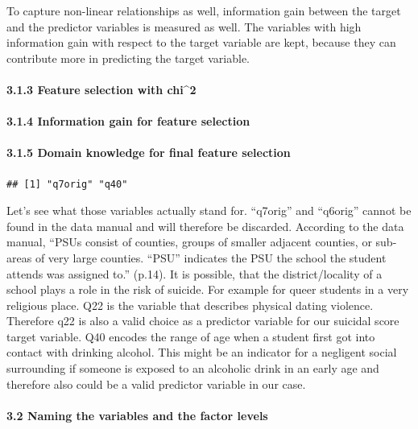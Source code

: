 \documentclass[
]{article}
\begin{document}
To capture non-linear relationships as well, information gain between
the target and the predictor variables is measured as well. The
variables with high information gain with respect to the target variable
are kept, because they can contribute more in predicting the target
variable.

\hypertarget{feature-selection-with-chi2}{%
\paragraph{3.1.3 Feature selection with
chi\^{}2}\label{feature-selection-with-chi2}}

\hypertarget{information-gain-for-feature-selection}{%
\paragraph{3.1.4 Information gain for feature
selection}\label{information-gain-for-feature-selection}}

\hypertarget{domain-knowledge-for-final-feature-selection}{%
\paragraph{3.1.5 Domain knowledge for final feature
selection}\label{domain-knowledge-for-final-feature-selection}}

\begin{verbatim}
## [1] "q7orig" "q40"
\end{verbatim}

Let's see what those variables actually stand for. ``q7orig'' and
``q6orig'' cannot be found in the data manual and will therefore be
discarded. According to the data manual, ``PSUs consist of counties,
groups of smaller adjacent counties, or sub-areas of very large
counties. ``PSU'' indicates the PSU the school the student attends was
assigned to.'' (p.14). It is possible, that the district/locality of a
school plays a role in the risk of suicide. For example for queer
students in a very religious place. Q22 is the variable that describes
physical dating violence. Therefore q22 is also a valid choice as a
predictor variable for our suicidal score target variable. Q40 encodes
the range of age when a student first got into contact with drinking
alcohol. This might be an indicator for a negligent social surrounding
if someone is exposed to an alcoholic drink in an early age and
therefore also could be a valid predictor variable in our case.

\hypertarget{naming-the-variables-and-the-factor-levels}{%
\paragraph{3.2 Naming the variables and the factor
levels}\label{naming-the-variables-and-the-factor-levels}}
\end{document}
